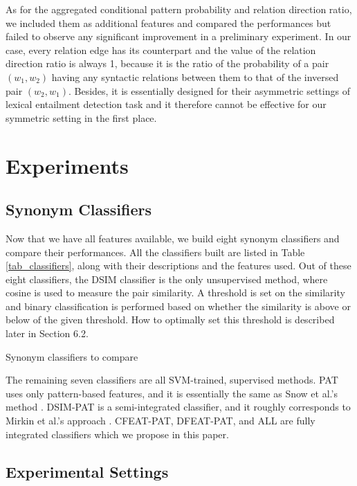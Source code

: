 \documentclass[english]{jnlp_1.4}
\begin{document}
As for the aggregated conditional pattern probability and relation
direction ratio, we included them as additional features and compared
the performances but failed to observe any significant improvement in
a preliminary experiment. In our case, every relation edge has its
counterpart and the value of the relation direction ratio is always 1,
because it is the ratio of the probability of a pair $(w_1, w_2)$
having any syntactic relations between them to that of the inversed
pair $(w_2, w_1)$.  Besides, it is essentially designed for their
asymmetric settings of lexical entailment detection task and it
therefore cannot be effective for our symmetric setting in the first
place.


\section{Experiments}

\subsection{Synonym Classifiers}


Now that we have all features available, we build eight synonym
classifiers and compare their performances. All the classifiers built
are listed in Table \ref{tab_classifiers}, along with their
descriptions and the features used. Out of these eight classifiers,
the DSIM classifier is the only unsupervised method, where cosine is
used to measure the pair similarity. A threshold is set on the
similarity and binary classification is performed based on whether the
similarity is above or below of the given threshold. How to optimally
set this threshold is described later in Section 6.2.

\begin{table}[t]
\caption{Synonym classifiers to compare}
\label{tab_classifiers}

\end{table}

The remaining seven classifiers are all SVM-trained, supervised
methods. PAT uses only pattern-based features, and it is essentially
the same as Snow et al.'s method \cite{Snow:04}. DSIM-PAT is a
semi-integrated classifier, and it roughly corresponds to Mirkin et
al.'s approach \cite{Mirkin:06}. CFEAT-PAT, DFEAT-PAT, and ALL are
fully integrated classifiers which we propose in this paper.


\subsection{Experimental Settings}
\end{document}
